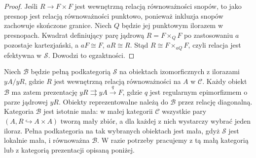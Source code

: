\begin{proof}
Jeśli $R\to F\times F$ jest wewnętrzną relacją równoważności snopów, to jako presnop jest relacją równoważności punktowo, ponieważ inkluzja snopów zachowuje skończone granice. Niech $Q$ będzie jej punktowym ilorazem w presnopach. Kwadrat definiujący parę jądrową $R=F\times_Q F$ po zastosowaniu $a$ pozostaje kartezjański, a $aF\cong F$, $aR\cong R$. Stąd $R\cong F\times_{aQ}F$, czyli relacja jest efektywna w $\mathcal S$. Dowodzi to egzaktności.
\end{proof}

Niech $\mathcal B$ będzie pełną podkategorią $\mathcal S$ na obiektach izomorficznych z ilorazami $yA/yR$, gdzie $R$ jest wewnętrzną relacją równoważności na $A$ w $\mathcal C$. Każdy obiekt $\mathcal B$ ma zatem prezentację $yR\rightrightarrows yA\xrightarrow{q}F$, gdzie $q$ jest regularnym epimorfizmem o parze jądrowej $yR$. Obiekty reprezentowalne należą do $\mathcal B$ przez relację diagonalną. Kategoria $\mathcal B$ jest istotnie mała: w małej kategorii $\mathcal C$ wszystkie pary $(A,R\hookrightarrow A\times A)$ tworzą mały zbiór, a dla każdej z nich wystarczy wybrać jeden iloraz. Pełna podkategoria na tak wybranych obiektach jest mała, gdyż $\mathcal S$ jest lokalnie mała, i równoważna $\mathcal B$. W razie potrzeby pracujemy z tą małą kategorią lub z kategorią prezentacji opisaną poniżej.

